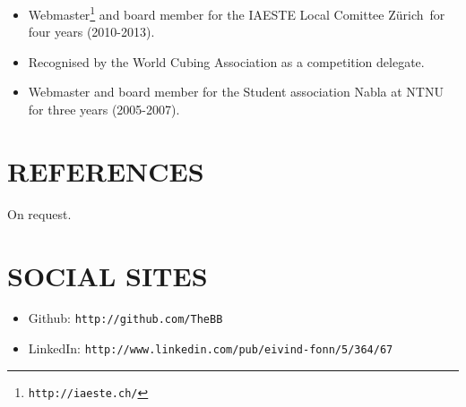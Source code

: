\documentclass[line,margin]{res}
\newcommand{\zh}{Z\"{u}rich}
\begin{document}
\begin{resume}
\begin{itemize}
\item Webmaster\footnote{{\tt http://iaeste.ch/}} and board member for the IAESTE Local Comittee
  \zh\ for four years (2010-2013).
\item Recognised by the World Cubing Association as a competition delegate.
\item Webmaster and board member for the Student association Nabla at NTNU for three years
  (2005-2007).
\end{itemize}


\section{REFERENCES}

On request.



\section{SOCIAL SITES}

\begin{itemize}
\item Github: \texttt{http://github.com/TheBB}
\item LinkedIn: \texttt{http://www.linkedin.com/pub/eivind-fonn/5/364/67}
\end{itemize}


\end{resume}
\end{document}
